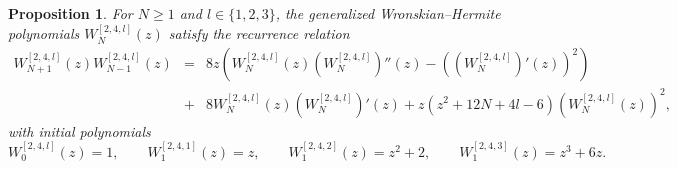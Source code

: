 \documentclass[10pt,a4paper]{amsart}
\newtheorem{proposition}{Proposition}
\begin{document}
\begin{proposition}
\label{prop:k4-W-recurrence}
For $N\geq1$ and $l \in \{1,2,3\}$, the generalized Wronskian--Hermite polynomials \(W_N^{[2,4,l]}(z)\) satisfy the recurrence relation
\begin{eqnarray}
\label{eq:k4-W-recurrence}
    W_{N+1}^{[2,4,l]}(z)W_{N-1}^{[2,4,l]}(z)&=&8z\left(W_N^{[2,4,l]}(z)\left(W_N^{[2,4,l]}\right)''(z)-\left(\left(W_N^{[2,4,l]}\right)'(z)\right)^2\right) \nonumber\\
    &+&8W_N^{[2,4,l]}(z)\left(W_N^{[2,4,l]}\right)'(z)+z\left(z^2+12N+4l-6\right)\left(W_N^{[2,4,l]}(z)\right)^2,
\end{eqnarray}
with initial polynomials
\begin{equation}
\label{eq:k4-W-initial-values}
    W_0^{[2,4,l]}(z)=1,\qquad W_1^{[2,4,1]}(z)=z,\qquad W_1^{[2,4,2]}(z)=z^2+2,\qquad W_1^{[2,4,3]}(z)=z^3+6z.
\end{equation}
\end{proposition}
\end{document}
